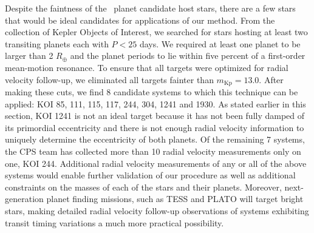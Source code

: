 Despite the faintness of the \kep\ planet candidate host stars, there are a few stars that would be ideal candidates for applications of our method. From the collection of Kepler Objects of Interest, we searched for stars hosting at least two transiting planets each with $P < 25$ days. We required at least one planet to be larger than 2 $R_\oplus$ and the planet periods to lie within five percent of a first-order mean-motion resonance. To ensure that all targets were optimized for radial velocity follow-up, we eliminated all targets fainter than $m_{\textrm{Kp}} = 13.0$. After making these cuts, we find 8 candidate systems to which this technique can be applied: KOI 85, 111, 115, 117, 244, 304, 1241 and 1930. As stated earlier in this section, KOI 1241 is not an ideal target because it has not been fully damped of its primordial eccentricity and there is not enough radial velocity information to uniquely determine the eccentricity of both planets. Of the remaining 7 systems, the CPS team has collected more than 10 radial velocity measurements only on one, KOI 244. Additional radial velocity measurements of any or all of the above systems would enable further validation of our procedure as well as additional constraints on the masses of each of the stars and their planets. Moreover, next-generation planet finding missions, such as TESS \citep{Brown08} and PLATO \citep{Catala10} will target bright stars, making detailed radial velocity follow-up observations of systems exhibiting transit timing variations a much more practical possibility. 

